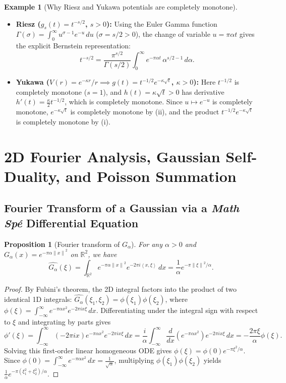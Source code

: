 \documentclass[11pt, a4paper]{article}
\newtheorem{proposition}[theorem]{Proposition}
\theoremstyle{definition}
\newtheorem{example}[theorem]{Example}
\theoremstyle{remark}
\newcommand{\R}{\mathbb{R}}
\newcommand{\norm}[1]{\left\lVert #1 \right\rVert}
\newcommand{\inner}[2]{\left\langle #1, #2 \right\rangle}
\begin{document}
\begin{example}[Why Riesz and Yukawa potentials are completely monotone]
\begin{itemize}
    \item \textbf{Riesz ($g_s(t) = t^{-s/2}$, $s > 0$):} Using the Euler Gamma function $\Gamma(\sigma) = \int_0^\infty u^{\sigma - 1} e^{-u} \, du$ ($\sigma = s/2 > 0$), the change of variable $u = \pi \alpha t$ gives the explicit Bernstein representation:
    \[
    t^{-s/2} = \frac{\pi^{s/2}}{\Gamma(s/2)} \int_0^\infty e^{-\pi \alpha t} \, \alpha^{s/2 - 1} \, d\alpha.
    \]
    \item \textbf{Yukawa ($V(r) = e^{-\kappa r}/r \implies g(t) = t^{-1/2} e^{-\kappa \sqrt{t}}$, $\kappa > 0$):} Here $t^{-1/2}$ is completely monotone ($s = 1$), and $h(t) = \kappa \sqrt{t} > 0$ has derivative $h'(t) = \frac{\kappa}{2} t^{-1/2}$, which is completely monotone. Since $u \mapsto e^{-u}$ is completely monotone, $e^{-\kappa \sqrt{t}}$ is completely monotone by (ii), and the product $t^{-1/2} e^{-\kappa \sqrt{t}}$ is completely monotone by (i).
\end{itemize}
\end{example}

\section{2D Fourier Analysis, Gaussian Self-Duality, and Poisson Summation}
\label{app:fourier}

\subsection{Fourier Transform of a Gaussian via a \textit{Math Sp\'e} Differential Equation}
\begin{proposition}[Fourier transform of $G_\alpha$]
For any $\alpha > 0$ and $G_\alpha(x) = e^{-\pi \alpha \norm{x}^2}$ on $\R^2$, we have
\[
\widehat{G_\alpha}(\xi) = \int_{\R^2} e^{-\pi \alpha \norm{x}^2} e^{-2\pi i \inner{x}{\xi}} \, dx = \frac{1}{\alpha} e^{-\pi \norm{\xi}^2 / \alpha}.
\]
\end{proposition}
\begin{proof}
By Fubini's theorem, the 2D integral factors into the product of two identical 1D integrals: $\widehat{G_\alpha}(\xi_1, \xi_2) = \phi(\xi_1) \phi(\xi_2)$, where $\phi(\xi) = \int_{-\infty}^\infty e^{-\pi \alpha x^2} e^{-2\pi i x \xi} \, dx$. Differentiating under the integral sign with respect to $\xi$ and integrating by parts gives
\[
\phi'(\xi) = \int_{-\infty}^\infty (-2\pi i x) e^{-\pi \alpha x^2} e^{-2\pi i x \xi} \, dx = \frac{i}{\alpha} \int_{-\infty}^\infty \frac{d}{dx}\left(e^{-\pi \alpha x^2}\right) e^{-2\pi i x \xi} \, dx = -\frac{2\pi \xi}{\alpha} \phi(\xi).
\]
Solving this first-order linear homogeneous ODE gives $\phi(\xi) = \phi(0) e^{-\pi \xi^2 / \alpha}$. Since $\phi(0) = \int_{-\infty}^\infty e^{-\pi \alpha x^2} \, dx = \frac{1}{\sqrt{\alpha}}$, multiplying $\phi(\xi_1) \phi(\xi_2)$ yields $\frac{1}{\alpha} e^{-\pi(\xi_1^2 + \xi_2^2)/\alpha}$.
\end{proof}
\end{document}
